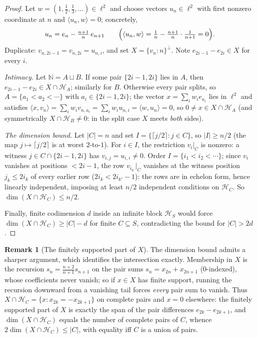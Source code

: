 \documentclass[11pt,reqno]{amsart}
\theoremstyle{definition}
\newtheorem{remark}[theorem]{Remark}
\newcommand{\HH}{\mathcal{H}}
\newcommand{\N}{\mathbb{N}}
\begin{document}
\begin{proof}
Let $w=(1,\tfrac12,\tfrac13,\dots)\in\ell^2$ and choose vectors $u_n\in\ell^2$ with
first nonzero coordinate at $n$ and $\langle u_n,w\rangle=0$; concretely,
\[
u_n=e_n-\tfrac{n+1}{n}\,e_{n+1}
\qquad\Bigl(\langle u_n,w\rangle=\tfrac1n-\tfrac{n+1}{n}\cdot\tfrac1{n+1}=0\Bigr).
\]
Duplicate: $v_{n,2i-1}=v_{n,2i}=u_{n,i}$, and set $X=\{v_n:n\}^\perp$. Note
$e_{2i-1}-e_{2i}\in X$ for every $i$.

\emph{Intimacy.} Let $\N=A\sqcup B$. If some pair $\{2i-1,2i\}$ lies in $A$, then
$e_{2i-1}-e_{2i}\in X\cap\HH_A$; similarly for $B$. Otherwise every pair splits, so
$A=\{a_1<a_2<\cdots\}$ with $a_i\in\{2i-1,2i\}$; the vector $x=\sum_iw_ie_{a_i}$ lies in
$\ell^2$ and satisfies
$\langle x,v_n\rangle=\sum_iw_iv_{n,a_i}=\sum_iw_iu_{n,i}=\langle w,u_n\rangle=0$, so
$0\neq x\in X\cap\HH_A$ (and symmetrically $X\cap\HH_B\neq0$: in the split case $X$
meets \emph{both} sides).

\emph{The dimension bound.} Let $|C|=n$ and set $I=\{\lceil j/2\rceil:j\in C\}$, so
$|I|\ge n/2$ (the map $j\mapsto\lceil j/2\rceil$ is at worst $2$-to-$1$). For $i\in I$,
the restriction $v_i|_C$ is nonzero: a witness $j\in C\cap\{2i-1,2i\}$ has
$v_{i,j}=u_{i,i}\neq0$. Order $I=\{i_1<i_2<\cdots\}$; since $v_{i}$ vanishes at
positions $<2i-1$, the row $v_{i_{k'}}|_C$ vanishes at the witness position $j_k\le2i_k$
of every earlier row ($2i_k<2i_{k'}-1$): the rows are in echelon form, hence linearly
independent, imposing at least $n/2$ independent conditions on $\HH_C$. So
$\dim(X\cap\HH_C)\le n/2$.

Finally, finite codimension $d$ inside an infinite block $\HH_S$ would force
$\dim(X\cap\HH_C)\ge|C|-d$ for finite $C\subseteq S$, contradicting the bound for
$|C|>2d$.
\end{proof}

\begin{remark}[The finitely supported part of $X$]\label{rem:pairsum}
The dimension bound admits a sharper argument, which identifies the intersection
exactly. Membership in $X$ is the recursion $s_n=\tfrac{n+2}{n+1}s_{n+1}$
on the pair sums $s_n=x_{2n}+x_{2n+1}$ (0-indexed), whose coefficients never
vanish; so if $x\in X$ has finite support, running the recursion downward from a
vanishing tail forces \emph{every} pair sum to vanish. Thus
$X\cap\HH_C=\{x:x_{2k}=-x_{2k+1}\}$ on complete pairs and $x=0$ elsewhere: the
finitely supported part of $X$ is exactly the span of the pair differences
$e_{2k}-e_{2k+1}$, and $\dim(X\cap\HH_C)$ equals the number of complete pairs of
$C$, whence $2\dim(X\cap\HH_C)\le|C|$, with equality iff $C$ is a union of pairs.
\end{remark}
\end{document}
